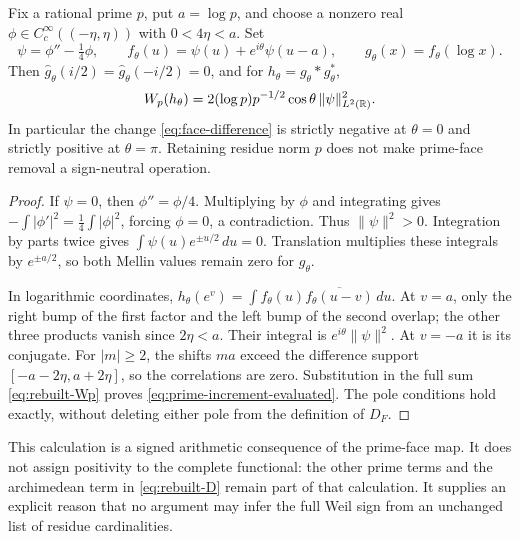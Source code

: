 \begin{theorem}\label{thm:prime-face-signs}
Fix a rational prime $p$, put $a=\log p$, and choose a nonzero real $\phi\in C_c^\infty((-\eta,\eta))$ with $0<4\eta<a$. Set
\[
 \psi=\phi''-\tfrac14\phi,\qquad
 f_\theta(u)=\psi(u)+e^{i\theta}\psi(u-a),\qquad
 g_\theta(x)=f_\theta(\log x).
\]
Then $\widehat g_\theta(i/2)=\widehat g_\theta(-i/2)=0$, and for $h_\theta=g_\theta*g_\theta^*$,
\begin{equation}\label{eq:prime-increment-evaluated}
 W_p(h_\theta)=2(\log p)p^{-1/2}\cos\theta\,\|\psi\|_{L^2(\mathbb R)}^2.
\end{equation}
In particular the change \eqref{eq:face-difference} is strictly negative at $\theta=0$ and strictly positive at $\theta=\pi$. Retaining residue norm $p$ does not make prime-face removal a sign-neutral operation.
\end{theorem}
\begin{proof}
If $\psi=0$, then $\phi''=\phi/4$. Multiplying by $\phi$ and integrating gives $-\int|\phi'|^2=\frac14\int|\phi|^2$, forcing $\phi=0$, a contradiction. Thus $\|\psi\|^2>0$.
Integration by parts twice gives
$\int\psi(u)e^{\pm u/2}\,du=0$. Translation multiplies these integrals by $e^{\pm a/2}$, so both Mellin values remain zero for $g_\theta$.

In logarithmic coordinates, $h_\theta(e^v)=\int f_\theta(u)\overline{f_\theta(u-v)}\,du$. At $v=a$, only the right bump of the first factor and the left bump of the second overlap; the other three products vanish since $2\eta<a$. Their integral is $e^{i\theta}\|\psi\|^2$. At $v=-a$ it is its conjugate. For $|m|\ge2$, the shifts $ma$ exceed the difference support $[-a-2\eta,a+2\eta]$, so the correlations are zero. Substitution in the full sum \eqref{eq:rebuilt-Wp} proves \eqref{eq:prime-increment-evaluated}. The pole conditions hold exactly, without deleting either pole from the definition of $D_F$.
\end{proof}

This calculation is a signed arithmetic consequence of the prime-face map. It does not assign positivity to the complete functional: the other prime terms and the archimedean term in \eqref{eq:rebuilt-D} remain part of that calculation. It supplies an explicit reason that no argument may infer the full Weil sign from an unchanged list of residue cardinalities.
